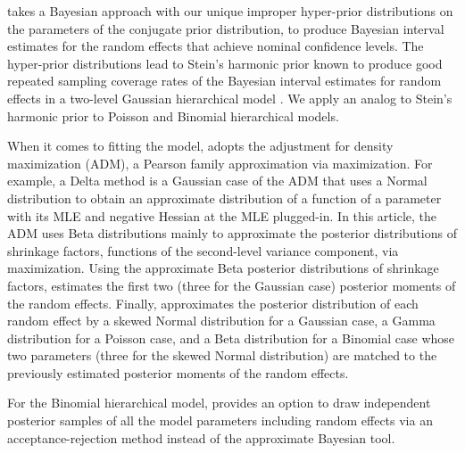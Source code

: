 \documentclass[article]{jss}
\begin{document}
 takes a Bayesian approach with our unique improper hyper-prior distributions on the parameters of the conjugate prior distribution, to produce  Bayesian interval   estimates for the random effects that achieve nominal confidence levels. The hyper-prior distributions lead to Stein's harmonic prior known to produce good repeated sampling coverage rates of the Bayesian interval estimates for random effects in a two-level Gaussian hierarchical model \citep{tang2011, morris2012, kelly2014advances}.  We apply an analog to Stein's harmonic prior to Poisson and Binomial hierarchical models. 


When it comes to fitting the model,  adopts the adjustment for density maximization \citep{carl1988, morris1997, tang2011} (ADM), a Pearson family approximation via maximization. For example, a Delta method is a Gaussian case of the ADM that uses a Normal distribution to obtain an approximate distribution of a function of a parameter with its MLE and negative Hessian at the MLE plugged-in. In this article, the ADM uses Beta distributions mainly to approximate the posterior distributions of shrinkage factors, functions of the second-level variance component, via maximization.  Using the approximate Beta posterior distributions of shrinkage factors,  estimates the first two (three for the Gaussian case) posterior moments of the random effects. Finally,  approximates the posterior distribution of each random effect by a skewed Normal distribution for a Gaussian case, a Gamma distribution for a Poisson case, and a Beta distribution for a Binomial case whose two parameters (three for the skewed Normal distribution) are matched to the previously estimated posterior moments of the random effects. 


For the Binomial  hierarchical model,  provides an option to draw independent posterior samples of all the model parameters including random effects via an acceptance-rejection method \citep{everson2000inference, tang2002fitting} instead of the approximate Bayesian tool.
\end{document}

